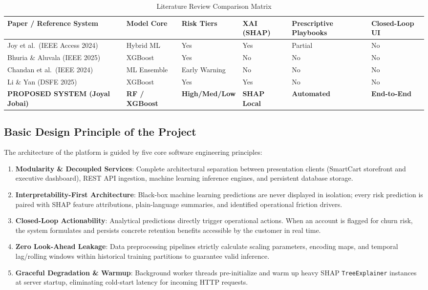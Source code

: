 \documentclass[12pt,a4paper]{article}
\begin{document}
\begin{table}[H]
\centering
\small
\caption{Literature Review Comparison Matrix}
\begin{tabularx}{\linewidth}{|l|l|C{1.8cm}|C{1.8cm}|C{2.0cm}|C{1.8cm}|}
\hline
\textbf{Paper / Reference System} & \textbf{Model Core} & \textbf{Risk Tiers} & \textbf{XAI (SHAP)} & \textbf{Prescriptive Playbooks} & \textbf{Closed-Loop UI} \\ \hline
Joy et al.\ (IEEE Access 2024) & Hybrid ML & Yes & Yes & Partial & No \\ \hline
Bhuria \& Aluvala (IEEE 2025) & XGBoost & Yes & No & No & No \\ \hline
Chandan et al.\ (IEEE 2024) & ML Ensemble & Early Warning & No & No & No \\ \hline
Li \& Yan (DSFE 2025) & XGBoost & Yes & Yes & No & No \\ \hline
\textbf{PROPOSED SYSTEM (Joyal Jobai)} & \textbf{RF / XGBoost} & \textbf{High/Med/Low} & \textbf{SHAP Local} & \textbf{Automated} & \textbf{End-to-End} \\ \hline
\end{tabularx}
\label{tab:comparison_matrix}
\end{table}

\subsection{Basic Design Principle of the Project}\label{sub:1.5}

The architecture of the platform is guided by five core software engineering principles:
\begin{enumerate}[leftmargin=20pt]
    \item \textbf{Modularity \& Decoupled Services}: Complete architectural separation between presentation clients (SmartCart storefront and executive dashboard), REST API ingestion, machine learning inference engines, and persistent database storage.
    \item \textbf{Interpretability-First Architecture}: Black-box machine learning predictions are never displayed in isolation; every risk prediction is paired with SHAP feature attributions, plain-language summaries, and identified operational friction drivers.
    \item \textbf{Closed-Loop Actionability}: Analytical predictions directly trigger operational actions. When an account is flagged for churn risk, the system formulates and persists concrete retention benefits accessible by the customer in real time.
    \item \textbf{Zero Look-Ahead Leakage}: Data preprocessing pipelines strictly calculate scaling parameters, encoding maps, and temporal lag/rolling windows within historical training partitions to guarantee valid inference.
    \item \textbf{Graceful Degradation \& Warmup}: Background worker threads pre-initialize and warm up heavy SHAP \texttt{TreeExplainer} instances at server startup, eliminating cold-start latency for incoming HTTP requests.
\end{enumerate}
\end{document}
